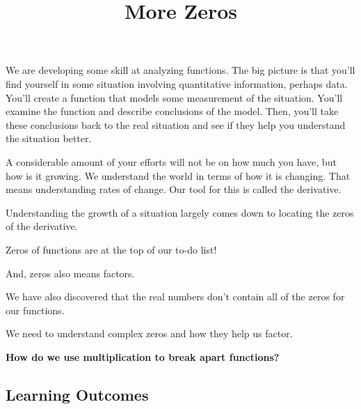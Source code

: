 \documentclass{ximera}
\title{More Zeros}
\begin{document}
\begin{abstract}
%
\end{abstract}
\maketitle




We are developing some skill at analyzing functions.  The big picture is that you'll find yourself in some situation involving quantitative information, perhaps data.  You'll create a function that models some measurement of the situation.  You'll examine the function and describe conclusions of the model.  Then, you'll take these conclusions back to the real situation and see if they help you understand the situation better.




A considerable amount of your efforts will not be on how much you have, but how is it growing.  We understand the world in terms of how it is changing.  That means understanding rates of change.  Our tool for this is called the derivative.




Understanding the growth of a situation largely comes down to locating the zeros of the derivative.


Zeros of functions are at the top of our to-do list!  

And, zeros also means factors.  


We have also discovered that the real numbers don't contain all of the zeros for our functions.  


We need to understand complex zeros and how they help us factor.  


\begin{center}
\textbf{\textcolor{red!80!black}{How do we use multiplication to break apart functions?}}
\end{center} 





















\subsection{Learning Outcomes}
\end{document}
